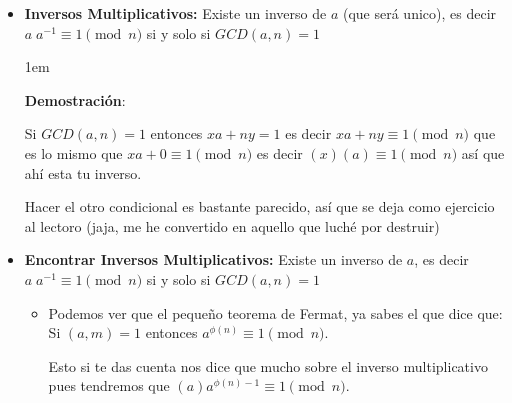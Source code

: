 \documentclass[12pt, fleqn]{report}                             %
\newenvironment{SmallIndentation}[1][0.75em]                    %
    {\begin{adjustwidth}{#1}{}\begin{footnotesize}}                 %
    {\end{footnotesize}\end{adjustwidth}}                           %
\newcommand{\Wrap}[1]{\left( #1 \right)}                        %
\begin{document}
\begin{itemize}
\begin{SmallIndentation}[1em]
                        Y ya que $GCD\Wrap{\frac{n}{GCD(c, n)}, \frac{c}{GCD(c, n)}} = 1$
                        entonces $\frac{n}{GCD(c, n)} | a - b$, es decir $a \equiv b \pmod{\frac{n}{GCD(c, n)}}$

                    \end{SmallIndentation}

                \clearpage

                \item 
                    \textbf{Inversos Multiplicativos:} 
                    Existe un inverso de $a$ (que será unico), es decir $a \; a^{-1} \equiv 1 \pmod{n}$
                    si y solo si $GCD(a, n) = 1$

                    \begin{SmallIndentation}[1em]
                        \textbf{Demostración}:
                        
                        Si $GCD(a, n) = 1$ entonces $xa + ny = 1$ es decir $xa + ny \equiv 1 \pmod{n}$
                        que es lo mismo que $xa + 0 \equiv 1 \pmod{n}$ es decir $(x)(a) \equiv 1 \pmod{n}$
                        así que ahí esta tu inverso.

                        Hacer el otro condicional es bastante parecido, así que se deja como ejercicio
                        al lectoro (jaja, me he convertido en aquello que luché por destruir)
                    
                    \end{SmallIndentation}
                        


                \item 
                    \textbf{Encontrar Inversos Multiplicativos:} 
                    Existe un inverso de $a$, es decir $a \; a^{-1} \equiv 1 \pmod{n}$ si y solo si
                    $GCD(a, n) = 1$

                    \begin{itemize}
                        \item 
                            Podemos ver que el pequeño teorema de Fermat, ya sabes el que dice que:
                            Si $(a, m) = 1$ entonces $a^{\phi(n)} \equiv 1 \pmod{n}$.

                            Esto si te das cuenta nos dice que mucho sobre el inverso multiplicativo
                            pues tendremos que $(a)a^{\phi(n)-1} \equiv 1 \pmod{n}$.


\end{itemize}
\end{itemize}
\end{document}
